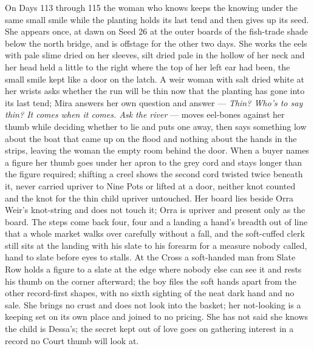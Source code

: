 \documentclass{design/chronicle}
\begin{document}
{On Days 113 through 115 the woman who knows keeps the knowing under the same small smile while the planting holds its last tend and then gives up its seed. She appears once, at dawn on Seed 26 at the outer boards of the fish-trade shade below the north bridge, and is offstage for the other two days. She works the eels with pale slime dried on her sleeves, silt dried pale in the hollow of her neck and her head held a little to the right where the top of her left ear had been, the small smile kept like a door on the latch. A weir woman with salt dried white at her wrists asks whether the run will be thin now that the planting has gone into its last tend; Mira answers her own question and answer — \emph{Thin? Who’s to say thin? It comes when it comes. Ask the river} — moves eel-bones against her thumb while deciding whether to lie and puts one away, then says something low about the boat that came up on the flood and nothing about the hands in the strips, leaving the woman the empty room behind the door. When a buyer names a figure her thumb goes under her apron to the grey cord and stays longer than the figure required; shifting a creel shows the second cord twisted twice beneath it, never carried upriver to Nine Pots or lifted at a door, neither knot counted and the knot for the thin child upriver untouched. Her board lies beside Orra Weir’s knot-string and does not touch it; Orra is upriver and present only as the board. The steps come back four, four and a landing a hand’s breadth out of line that a whole market walks over carefully without a fall, and the soft-cuffed clerk still sits at the landing with his slate to his forearm for a measure nobody called, hand to slate before eyes to stalls. At the Cross a soft-handed man from Slate Row holds a figure to a slate at the edge where nobody else can see it and rests his thumb on the corner afterward; the boy files the soft hands apart from the other record-first shapes, with no sixth sighting of the neat dark hand and no sale. She brings no crust and does not look into the basket; her not-looking is a keeping set on its own place and joined to no pricing. She has not said she knows the child is Dessa’s; the secret kept out of love goes on gathering interest in a record no Court thumb will look at.

}
\end{document}

